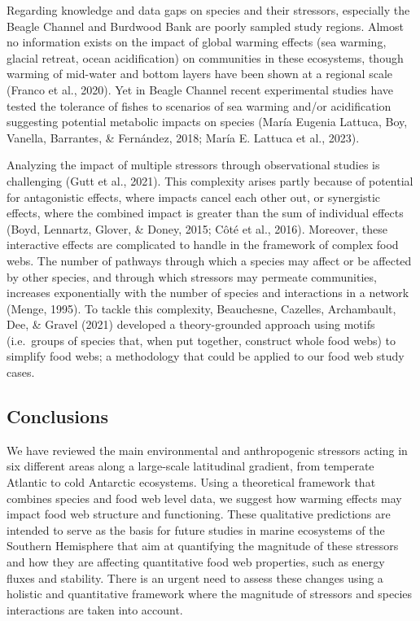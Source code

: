 \documentclass[
]{article}
\begin{document}
Regarding knowledge and data gaps on species and their stressors,
especially the Beagle Channel and Burdwood Bank are poorly sampled study
regions. Almost no information exists on the impact of global warming
effects (sea warming, glacial retreat, ocean acidification) on
communities in these ecosystems, though warming of mid-water and bottom
layers have been shown at a regional scale (Franco et al., 2020). Yet in
Beagle Channel recent experimental studies have tested the tolerance of
fishes to scenarios of sea warming and/or acidification suggesting
potential metabolic impacts on species (María Eugenia Lattuca, Boy,
Vanella, Barrantes, \& Fernández, 2018; María E. Lattuca et al., 2023).

Analyzing the impact of multiple stressors through observational studies
is challenging (Gutt et al., 2021). This complexity arises partly
because of potential for antagonistic effects, where impacts cancel each
other out, or synergistic effects, where the combined impact is greater
than the sum of individual effects (Boyd, Lennartz, Glover, \& Doney,
2015; Côté et al., 2016). Moreover, these interactive effects are
complicated to handle in the framework of complex food webs. The number
of pathways through which a species may affect or be affected by other
species, and through which stressors may permeate communities, increases
exponentially with the number of species and interactions in a network
(Menge, 1995). To tackle this complexity, Beauchesne, Cazelles,
Archambault, Dee, \& Gravel (2021) developed a theory-grounded approach
using motifs (i.e.~groups of species that, when put together, construct
whole food webs) to simplify food webs; a methodology that could be
applied to our food web study cases.

\hypertarget{conclusions}{%
\subsection{Conclusions}\label{conclusions}}

We have reviewed the main environmental and anthropogenic stressors
acting in six different areas along a large-scale latitudinal gradient,
from temperate Atlantic to cold Antarctic ecosystems. Using a
theoretical framework that combines species and food web level data, we
suggest how warming effects may impact food web structure and
functioning. These qualitative predictions are intended to serve as the
basis for future studies in marine ecosystems of the Southern Hemisphere
that aim at quantifying the magnitude of these stressors and how they
are affecting quantitative food web properties, such as energy fluxes
and stability. There is an urgent need to assess these changes using a
holistic and quantitative framework where the magnitude of stressors and
species interactions are taken into account.
\end{document}
